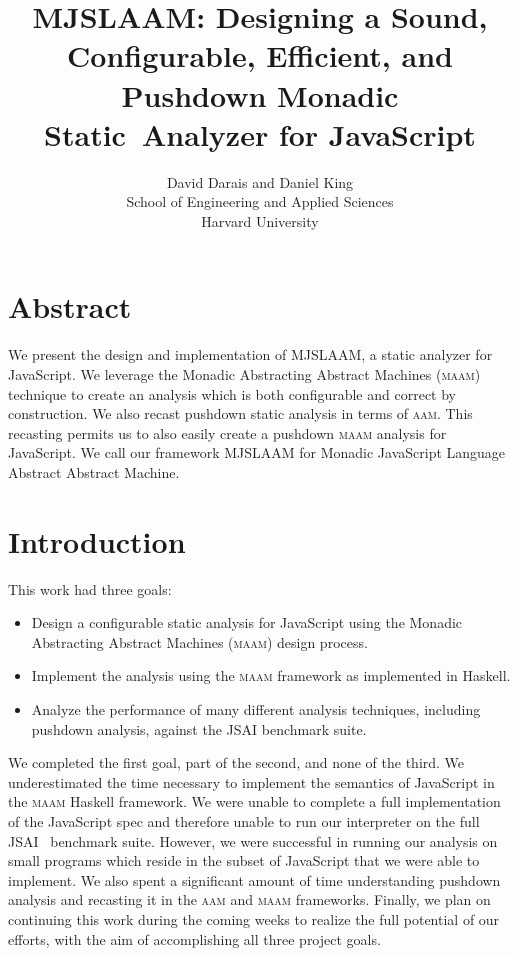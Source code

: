 \documentclass[10pt,letter,english]{article}
\newcommand{\aam}[0]{\textsc{aam}}
\newcommand{\maam}[0]{\textsc{maam}}
\newcommand{\js}[0]{JavaScript}
\begin{document}
\title{MJSLAAM: Designing a Sound, Configurable, Efficient, and Pushdown %
              Monadic Static~Analyzer for JavaScript}
\author{{David Darais and Daniel King}\\
        School of Engineering and Applied Sciences\\
        Harvard University}

\maketitle

\section*{Abstract}

We present the design and implementation of MJSLAAM, a static analyzer for \js{}. We
leverage the Monadic Abstracting Abstract Machines (\maam{}) technique to
create an analysis which is both configurable and correct by construction. We
also recast pushdown static analysis in terms of \aam{}. This recasting permits
us to also easily create a pushdown \maam{} analysis for \js{}.
We call our framework MJSLAAM for Monadic JavaScript Language Abstract Abstract
Machine.

\section{Introduction}

This work had three goals:

\begin{itemize}
  \item Design a configurable static analysis for \js{} using the
  Monadic Abstracting Abstract Machines (\maam{}) \cite{maam} design process.
\item Implement the analysis using the \maam{} framework as implemented in Haskell.
\item Analyze the performance of many different analysis techniques, including
  pushdown analysis, against the JSAI \cite{jsai} benchmark suite.
\end{itemize}

We completed the first goal, part of the second, and none of the third.
%
We underestimated the time necessary to implement the semantics of \js{} in the
\maam{} Haskell framework.
%
We were unable to complete a full implementation of the \js{} spec and
therefore unable to run our interpreter on the full JSAI~\cite{jsai} benchmark
suite.
%
However, we were successful in running our analysis on small programs which
reside in the subset of \js{} that we were able to implement.
%
We also spent a significant amount of time understanding pushdown analysis and
recasting it in the \aam{} and \maam{} frameworks.
%
Finally, we plan on continuing this work during the coming weeks to realize the
full potential of our efforts, with the aim of accomplishing all three project
goals.
\end{document}
